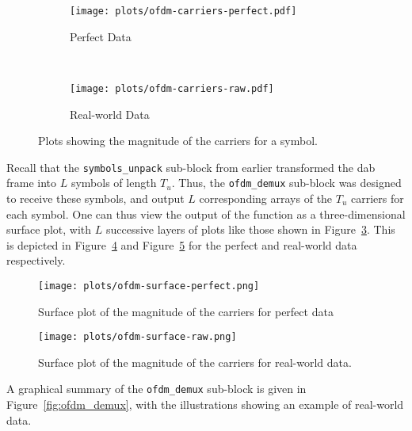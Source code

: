 \documentclass[class=report,11pt,crop=false]{standalone}
\begin{document}
\begin{figure}[htbp]
  \centering
  \captionsetup{type=figure}
  \begin{subfigure}[t]{0.45\textwidth}
    \centering
    \captionsetup{type=figure}
    \texttt{[image: plots/ofdm-carriers-perfect.pdf]}
    \caption{Perfect Data}
    \label{fig:ofdm-carriers-perfect}
  \end{subfigure}%
  ~ 
  \begin{subfigure}[t]{0.45\textwidth}
    \centering
    \captionsetup{type=figure}
    \texttt{[image: plots/ofdm-carriers-raw.pdf]}
    \caption{Real-world Data}
    \label{fig:ofdm-carriers-raw}
  \end{subfigure}
  \caption{Plots showing the magnitude of the  carriers for a  symbol.}
  \label{fig:ofdm-carriers}
\end{figure}

Recall that the \texttt{symbols\_unpack} sub-block from earlier transformed the \gls{dab} frame into \(L\) symbols of length \(T_u\). Thus, the \texttt{ofdm\_demux} sub-block was designed to receive these symbols, and output \(L\) corresponding arrays of the \(T_u\) carriers for each symbol. One can thus view the output of the function as a three-dimensional surface plot, with \(L\) successive layers of plots like those shown in Figure~\ref{fig:ofdm-carriers}. This is depicted in Figure~\ref{fig:ofdm-surface-perfect} and Figure~\ref{fig:ofdm-surface-raw} for the perfect and real-world data respectively.

\begin{figure}[htbp]
  \centering
  \captionsetup{type=figure}
  \texttt{[image: plots/ofdm-surface-perfect.png]}
  \caption{Surface plot of the magnitude of the  carriers for perfect data}
  \label{fig:ofdm-surface-perfect}
\end{figure}

\begin{figure}[htbp]
  \centering
  \captionsetup{type=figure}
  \texttt{[image: plots/ofdm-surface-raw.png]}
  \caption{Surface plot of the magnitude of the  carriers for real-world data.}
  \label{fig:ofdm-surface-raw}
\end{figure}

A graphical summary of the \texttt{ofdm\_demux} sub-block is given in Figure~\ref{fig:ofdm_demux}, with the illustrations showing an example of real-world data.
\end{document}
